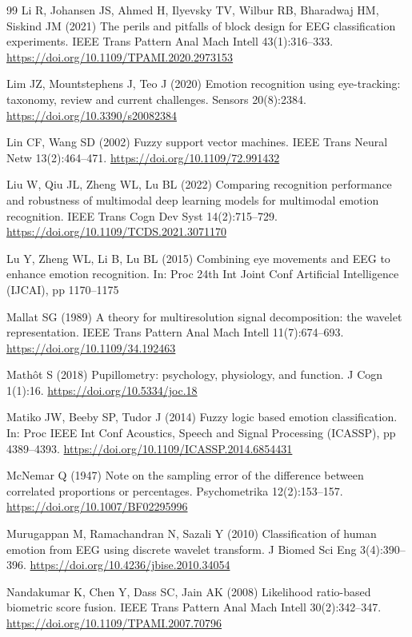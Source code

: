 \documentclass[11pt,a4paper]{article}
\begin{document}
\begin{thebibliography}{99}
 Li R, Johansen JS, Ahmed H, Ilyevsky TV, Wilbur RB, Bharadwaj HM, Siskind JM (2021) The perils and pitfalls of block design for EEG classification experiments. IEEE Trans Pattern Anal Mach Intell 43(1):316--333. \url{https://doi.org/10.1109/TPAMI.2020.2973153}

 Lim JZ, Mountstephens J, Teo J (2020) Emotion recognition using eye-tracking: taxonomy, review and current challenges. Sensors 20(8):2384. \url{https://doi.org/10.3390/s20082384}

 Lin CF, Wang SD (2002) Fuzzy support vector machines. IEEE Trans Neural Netw 13(2):464--471. \url{https://doi.org/10.1109/72.991432}

 Liu W, Qiu JL, Zheng WL, Lu BL (2022) Comparing recognition performance and robustness of multimodal deep learning models for multimodal emotion recognition. IEEE Trans Cogn Dev Syst 14(2):715--729. \url{https://doi.org/10.1109/TCDS.2021.3071170}

 Lu Y, Zheng WL, Li B, Lu BL (2015) Combining eye movements and EEG to enhance emotion recognition. In: Proc 24th Int Joint Conf Artificial Intelligence (IJCAI), pp 1170--1175

 Mallat SG (1989) A theory for multiresolution signal decomposition: the wavelet representation. IEEE Trans Pattern Anal Mach Intell 11(7):674--693. \url{https://doi.org/10.1109/34.192463}

 Math\^ot S (2018) Pupillometry: psychology, physiology, and function. J Cogn 1(1):16. \url{https://doi.org/10.5334/joc.18}

 Matiko JW, Beeby SP, Tudor J (2014) Fuzzy logic based emotion classification. In: Proc IEEE Int Conf Acoustics, Speech and Signal Processing (ICASSP), pp 4389--4393. \url{https://doi.org/10.1109/ICASSP.2014.6854431}

 McNemar Q (1947) Note on the sampling error of the difference between correlated proportions or percentages. Psychometrika 12(2):153--157. \url{https://doi.org/10.1007/BF02295996}

 Murugappan M, Ramachandran N, Sazali Y (2010) Classification of human emotion from EEG using discrete wavelet transform. J Biomed Sci Eng 3(4):390--396. \url{https://doi.org/10.4236/jbise.2010.34054}

 Nandakumar K, Chen Y, Dass SC, Jain AK (2008) Likelihood ratio-based biometric score fusion. IEEE Trans Pattern Anal Mach Intell 30(2):342--347. \url{https://doi.org/10.1109/TPAMI.2007.70796}


\end{thebibliography}
\end{document}
